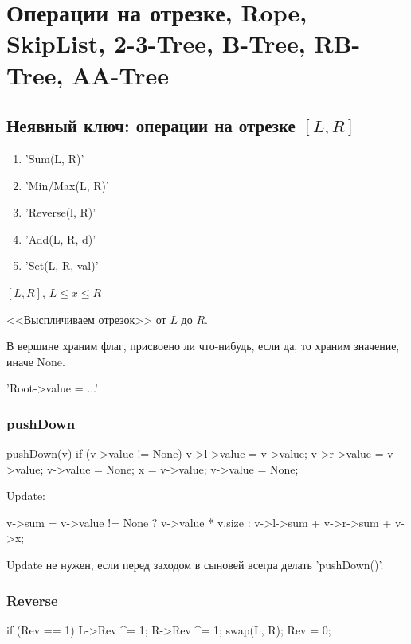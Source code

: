 \chapter{Операции на отрезке, Rope, SkipList, 2-3-Tree, B-Tree, RB-Tree, AA-Tree}

\section {Неявный ключ: операции на отрезке $[L, R]$}

\begin{enumerate}
	\item \cpp'Sum(L, R)'
	\item \cpp'Min/Max(L, R)'
	\item \cpp'Reverse(l, R)'
	\item \cpp'Add(L, R, d)'
	\item \cpp'Set(L, R, val)'
\end{enumerate}

$[L, R]$, $L \le x \le R$

<<Выспличиваем отрезок>> от $L$ до $R$.

В вершине храним флаг, присвоено ли что-нибудь, если да, то храним значение, иначе None.

\cpp'Root->value = ...'

\subsection{pushDown}
\begin{cppcode}
pushDown(v)
{
	if (v->value != None)
	{
		v->l->value = v->value;
		v->r->value = v->value;
		v->value = None;
		x = v->value;
		v->value = None;
	}
}
\end{cppcode}

Update:
\begin{cppcode}
	v->sum = v->value != None ? v->value * v.size :
	v->l->sum + v->r->sum + v->x;
\end{cppcode}

\begin{Rem}
	Update не нужен, если перед заходом в сыновей всегда делать \cpp'pushDown()'.
\end{Rem}

\subsection{Reverse}
\begin{cppcode}
if (Rev == 1)
{
	L->Rev ^= 1;
	R->Rev ^= 1;
	swap(L, R);
	Rev = 0;
}
\end{cppcode}

